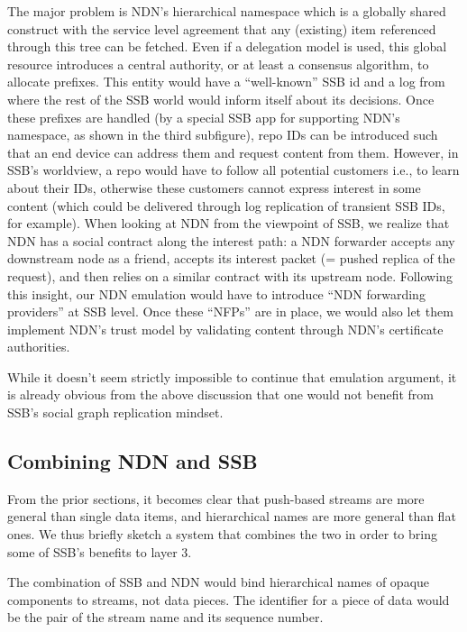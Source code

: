 \documentclass[9pt,sigconf]{acmart}
\begin{document}
The major problem is NDN's hierarchical namespace which is a globally
shared construct with the service level agreement that any (existing)
item referenced through this tree can be fetched.  Even if a
delegation model is used, this global resource introduces a central
authority, or at least a consensus algorithm, to allocate
prefixes. This entity would have a ``well-known'' SSB id and a log
from where the rest of the SSB world would inform itself about its
decisions. Once these prefixes are handled (by a special SSB app for
supporting NDN's namespace, as shown in the third subfigure), repo IDs
can be introduced such that an end device can address them and request
content from them. However, in SSB's worldview, a repo would have to
follow all potential customers i.e., to learn about their IDs,
otherwise these customers cannot express interest in some content
(which could be delivered through log replication of transient SSB
IDs, for example). When looking at NDN from the viewpoint of SSB,
 we realize that NDN has a social contract along the interest path:
 a NDN forwarder accepts any downstream node as a friend, accepts its interest packet (= pushed
replica of the request), and then relies on a similar contract with
its upstream node. Following this insight, our NDN emulation would
have to introduce ``NDN forwarding providers'' at SSB level. Once
these ``NFPs'' are in place, we would also let them implement
NDN's trust model by validating content through NDN's certificate
authorities.

While it doesn't seem strictly impossible to continue that emulation
argument, it is already obvious from the above discussion that one
would not benefit from SSB's social graph replication mindset.


\subsection{Combining NDN and SSB}

From the prior sections, it becomes clear that push-based streams are more general than single data items, and hierarchical names are more general than flat ones. We thus briefly sketch a system that combines the two in order to bring some of SSB's benefits to layer 3.

The combination of SSB and NDN would bind hierarchical names of opaque components to streams, not data pieces. The identifier for a piece of data would be the pair of the stream name and its sequence number.
\end{document}
